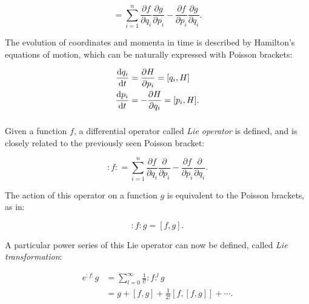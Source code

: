 \begin{equation}
    [f,g] = \sum^n_{i=1} \frac{\partial f}{\partial q_i} \frac{\partial g}{\partial p_i}
                       - \frac{\partial f}{\partial p_i} \frac{\partial g}{\partial q_i}.
    \label{eq:coordinate_systems:poisson_bracket}
\end{equation}


The evolution of coordinates and momenta in time is described by Hamilton's equations of motion, which can
be naturally expressed with Poisson brackets:

\begin{equation}
    \begin{aligned}
        \frac{\mathop{}\!\mathrm{d} q_i}{\mathop{}\!\mathrm{d} t} &= \frac{\partial H}{\partial p_i}  = [q_i, H] \\
        \frac{\mathop{}\!\mathrm{d} p_i}{\mathop{}\!\mathrm{d} t} &= -\frac{\partial H}{\partial q_i}  = [p_i, H].
    \end{aligned}
\end{equation}


\subsubsection{}

Given a function $f$, a differential operator called \textit{Lie operator} is defined, and is closely
related to the previously seen Poisson bracket:

\begin{equation}
:f: = \sum^n_{i=1} \frac{\partial f}{\partial q_i} \frac{\partial}{\partial p_i}
                    - \frac{\partial f}{\partial p_i} \frac{\partial}{\partial q_i}.
\end{equation}

The action of this operator on a function $g$ is equivalent to the Poisson brackets, as in:

\begin{equation}
    :f:g = [f,g].
\end{equation}

A particular power series of this Lie operator can now be defined, called \textit{Lie
transformation}:

\begin{equation}
    \begin{aligned}
        e^{:f:}g &= \sum_{l=0}^\infty \frac{1}{l!} :f:^l g \\
                 &= g + [f,g] + \frac{1}{2!}[f, [f, g]] + \cdots .
    \end{aligned}
    \label{eq:coordinate_systems:expansion_exponential}
\end{equation}



